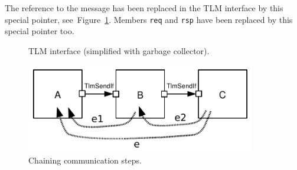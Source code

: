The reference to the message has been replaced in the TLM interface by
this special pointer, see~Figure~\ref{fig:interface2}. Members
\texttt{req} and \texttt{rsp} have been replaced by this special
pointer too.

\begin{figure}[h]
  \begin{center}
    
    \caption{\label{fig:interface2} TLM interface (simplified with
      garbage collector).}
  \end{center}
\end{figure}


\begin{figure}[h]
  \begin{center}
    \includegraphics[width=10.0cm]{tlm/chaining_communication_steps.pdf}
    \caption{\label{fig:chaining_communication_steps} Chaining communication steps.}
  \end{center}
\end{figure}

